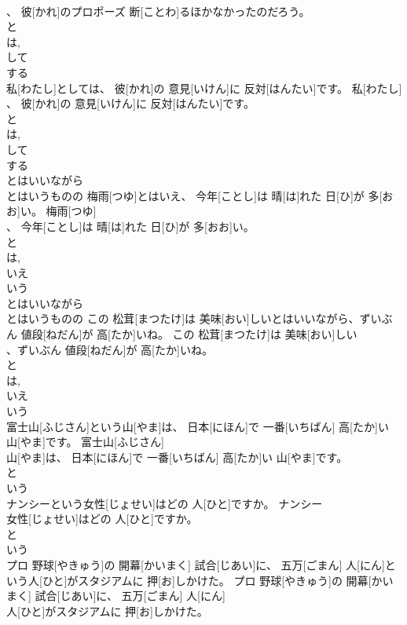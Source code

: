 \documentclass[8pt]{extreport}
\begin{document}
\begin{CJK}{UTF8}{min}
\\	、 彼[かれ]のプロポーズ 断[ことわ]るほかなかったのだろう。	
\\	と 
\\	は, 
\\	して 
\\	する
\\	私[わたし]としては、 彼[かれ]の 意見[いけん]に 反対[はんたい]です。	私[わたし]
\\	、 彼[かれ]の 意見[いけん]に 反対[はんたい]です。	
\\	と 
\\	は, 
\\	して 
\\	する
\\	とはいいながら 
\\	とはいうものの	梅雨[つゆ]とはいえ、 今年[ことし]は 晴[は]れた 日[ひ]が 多[おお]い。	梅雨[つゆ]
\\	、 今年[ことし]は 晴[は]れた 日[ひ]が 多[おお]い。	
\\	と 
\\	は, 
\\	いえ 
\\	いう 
\\	とはいいながら 
\\	とはいうものの	この 松茸[まつたけ]は 美味[おい]しいとはいいながら、ずいぶん 値段[ねだん]が 高[たか]いね。	この 松茸[まつたけ]は 美味[おい]しい
\\	、ずいぶん 値段[ねだん]が 高[たか]いね。	
\\	と 
\\	は, 
\\	いえ 
\\	いう 
\\	富士山[ふじさん]という山[やま]は、 日本[にほん]で 一番[いちばん] 高[たか]い 山[やま]です。	富士山[ふじさん]
\\	山[やま]は、 日本[にほん]で 一番[いちばん] 高[たか]い 山[やま]です。	
\\	と 
\\	いう
\\	ナンシーという女性[じょせい]はどの 人[ひと]ですか。	ナンシー
\\	女性[じょせい]はどの 人[ひと]ですか。	
\\	と 
\\	いう
\\	プロ 野球[やきゅう]の 開幕[かいまく] 試合[じあい]に、 五万[ごまん] 人[にん]という人[ひと]がスタジアムに 押[お]しかけた。	プロ 野球[やきゅう]の 開幕[かいまく] 試合[じあい]に、 五万[ごまん] 人[にん]
\\	人[ひと]がスタジアムに 押[お]しかけた。	

\end{CJK}
\end{document}
